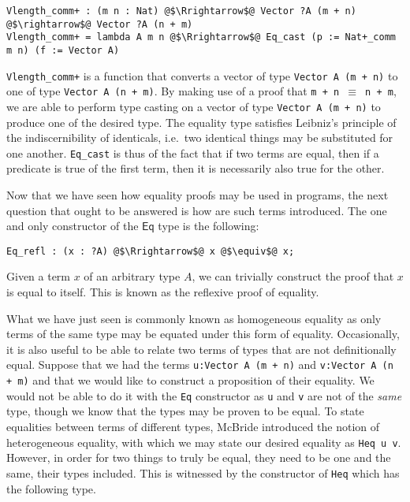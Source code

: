 \documentclass[12pt,twoside,maitrise]{dms}
\theoremstyle{definition}
\numberwithin{equation}{section}
\numberwithin{table}{chapter}
\numberwithin{figure}{chapter}
\newcommand\kw[1] {\textsf{#1}}
\newcommand\id[1] {\texttt{#1}}
\newcommand\fn[1] {\texttt{#1}}
\begin{document}
\begin{verbatim}
Vlength_comm+ : (m n : Nat) @$\Rrightarrow$@ Vector ?A (m + n) @$\rightarrow$@ Vector ?A (n + m)
Vlength_comm+ = lambda A m n @$\Rrightarrow$@ Eq_cast (p := Nat+_comm m n) (f := Vector A)
\end{verbatim}

\fn{Vlength\_comm+} is a function that converts a vector of type \fn{Vector A (m
  + n)} to one of type \fn{Vector A (n + m)}. By making use of a proof that
\fn{m + n $\equiv$ n + m}, we are able to perform type casting on a vector of
type \fn{Vector A (m + n)} to produce one of the desired type. The equality type
satisfies Leibniz's principle of the indiscernibility of identicals, i.e.\ two
identical things may be substituted for one another. \fn{Eq\_cast} is thus of
the fact that if two terms are equal, then if a predicate is true of the first
term, then it is necessarily also true for the other.


Now that we have seen how equality proofs may be used in programs, the next
question that ought to be answered is how are such terms introduced. The one and
only constructor of the $\kw{Eq}$ type is the following:

\begin{verbatim}
Eq_refl : (x : ?A) @$\Rrightarrow$@ x @$\equiv$@ x;
\end{verbatim}

Given a term $x$ of an arbitrary type $A$, we can trivially construct the proof
that $x$ is equal to itself. This is known as the reflexive proof of equality.

What we have just seen is commonly known as homogeneous equality as only terms
of the same type may be equated under this form of equality. Occasionally, it is
also useful to be able to relate two terms of types that are not definitionally
equal. Suppose that we had the terms \fn{u:Vector A (m + n)} and \fn{v:Vector A
  (n + m)} and that we would like to construct a proposition of their equality.
We would not be able to do it with the \fn{Eq} constructor as \id{u} and \id{v}
are not of the \emph{same} type, though we know that the types may be proven to
be equal. To state equalities between terms of different types, McBride
introduced the notion of heterogeneous equality\cite{mcbride2000dependently},
with which we may state our desired equality as \fn{Heq u v}. However, in order
for two things to truly be equal, they need to be one and the same, their types
included. This is witnessed by the constructor of \fn{Heq} which has the
following type.
\end{document}
